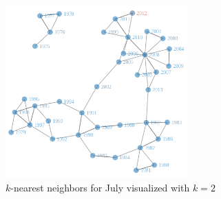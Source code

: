 \begin{figure}[tb]
 	\begin{center}
 		\includegraphics[width=7cm]{figures/NNgraph.png}
 	\end{center}
 	\caption{$k$-nearest neighbors for July visualized with $k = 2$}
 	\label{fig:NNgraph}
 \end{figure} 

